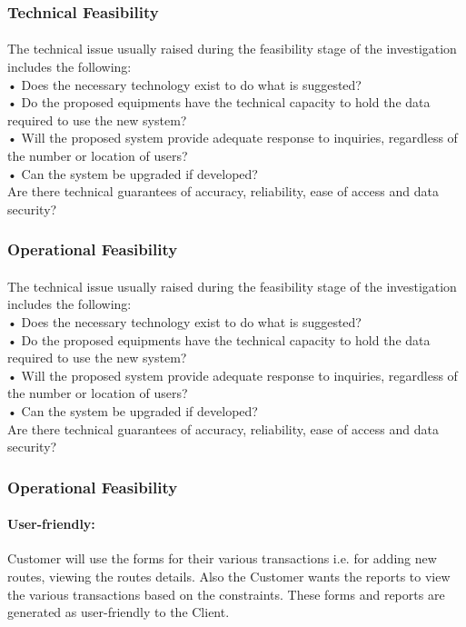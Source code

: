 \subsubsection{Technical Feasibility}
\paragraph{} The technical issue usually raised during the feasibility stage of the investigation includes the following:\\
•	Does the necessary technology exist to do what is suggested?\\
•	Do the proposed equipments have the technical capacity to hold the data required to use the new system?\\
•	Will the proposed system provide adequate response to inquiries, regardless of the number or location of users?\\
•	Can the system be upgraded if developed?\\
Are there technical guarantees of accuracy, reliability, ease of access and data security?

\subsubsection{Operational Feasibility}
\paragraph{} The technical issue usually raised during the feasibility stage of the investigation includes the following:\\
•	Does the necessary technology exist to do what is suggested?\\
•	Do the proposed equipments have the technical capacity to hold the data required to use the new system?\\
•	Will the proposed system provide adequate response to inquiries, regardless of the number or location of users?\\
•	Can the system be upgraded if developed?\\
Are there technical guarantees of accuracy, reliability, ease of access and data security?

\subsubsection{Operational Feasibility}
\paragraph{User-friendly: }
\begin{enumerate}
Customer will use the forms for their various transactions i.e. for adding new routes, viewing the routes details. Also the Customer wants the reports to view the various transactions based on the constraints. These forms and reports are generated as user-friendly to the Client.\\
\end{enumerate}

